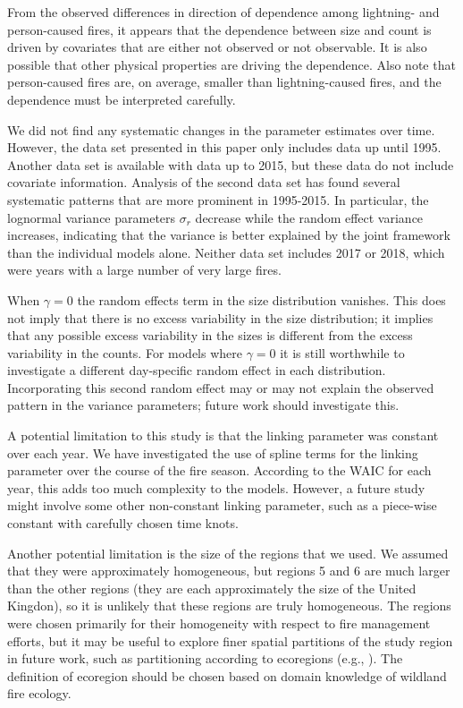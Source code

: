 \documentclass[10pt,letterpaper]{article}
\begin{document}
From the observed differences in direction of dependence among lightning- and person-caused fires, it appears that the dependence
between size and count is driven by covariates that are either not
observed or not observable. It is also possible that other physical
properties are driving the dependence. Also note that person-caused
fires are, on average, smaller than lightning-caused fires, and the
dependence must be interpreted carefully.

We did not find any systematic changes in the parameter estimates over
time. However, the data set presented in this paper only includes data
up until 1995. Another data set is available with data up to 2015, but
these data do not include covariate information. Analysis of the second
data set has found several systematic patterns that are more prominent
in 1995-2015. In particular, the lognormal variance parameters
\(\sigma_r\) decrease while the random effect variance increases,
indicating that the variance is better explained by the joint framework
than the individual models alone. Neither data set includes 2017 or
2018, which were years with a large number of very large fires.

When $\gamma = 0$ the random effects term in the size distribution vanishes. This does not imply that there is no excess variability in the size distribution; it implies that any possible excess variability in the sizes is different from the excess variability in the counts. For models where $\gamma = 0$ it is still worthwhile to investigate a different day-specific random effect in each distribution. Incorporating this second random effect may or may not explain the observed pattern in the variance parameters; future work should investigate this.

A potential limitation to this study is that the linking parameter was
constant over each year. We have investigated the use of spline terms
for the linking parameter over the course of the fire season. According
to the WAIC for each year, this adds too much complexity to the models.
However, a future study might involve some other non-constant linking
parameter, such as a piece-wise constant with carefully chosen time knots.

Another potential limitation is the size of the regions that we used. We
assumed that they were approximately homogeneous, but regions 5 and 6
are much larger than the other regions (they are each approximately the size of the United Kingdon), so it is unlikely
that these regions are truly homogeneous. The regions were chosen
primarily for their homogeneity with respect to fire management efforts,
but it may be useful to explore finer spatial partitions of the study region in future work, such as partitioning according to ecoregions (e.g., \cite{ecologicalstratificationworkinggroupcanadaNationalEcologicalFramework1996}). The definition of ecoregion should be chosen based on domain
knowledge of wildland fire ecology.
\end{document}

